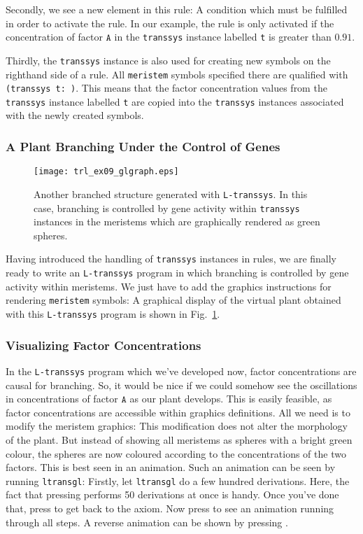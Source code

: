 \documentclass[12pt]{article}
\newcommand{\transsys}{\texttt{transsys}}
\newcommand{\ltranssys}{\texttt{L-}\transsys}
\newcommand{\codeword}[1]{\texttt{#1}}
\newcommand{\factorsym}[1]{\ensuremath{\mathtt{#1}}}
\newcommand{\prgname}[1]{\texttt{#1}}
\newcommand{\keyboardin}[1]{\fbox{\texttt{#1}}}
\begin{document}
Secondly, we see a new element in this rule: A condition which must be
fulfilled in order to activate the rule. In our example, the rule is
only activated if the concentration of factor \factorsym{A} in the
\transsys{} instance labelled \codeword{t} is greater than $0.91$.

Thirdly, the \transsys{} instance is also used for creating new
symbols on the righthand side of a rule. All \codeword{meristem}
symbols specified there are qualified with \codeword{(transsys~t:~)}.
This means that the factor concentration values from the \transsys{}
instance labelled \codeword{t} are copied into the \transsys{}
instances associated with the newly created symbols.


\subsubsection{A Plant Branching Under the Control of Genes}

\begin{figure}
\centerline{
  \texttt{[image: trl\_ex09\_glgraph.eps]}
}
\caption{\label{fig_transsysgrow}
  Another branched structure generated with \ltranssys{}. In this
  case, branching is controlled by gene activity within \transsys{}
  instances in the meristems which are graphically rendered as green
  spheres.
}
\end{figure}

Having introduced the handling of \transsys{} instances in rules, we
are finally ready to write an \ltranssys{} program in which branching
is controlled by gene activity within meristems. We just have to add
the graphics instructions for rendering \codeword{meristem} symbols:
A graphical display of the virtual plant obtained with this
\ltranssys{} program is shown in Fig.\ \ref{fig_transsysgrow}.


\subsubsection{Visualizing Factor Concentrations}

In the \ltranssys{} program which we've developed now, factor
concentrations are causal for branching. So, it would be nice if we
could somehow see the oscillations in concentrations of factor
\factorsym{A} as our plant develops. This is easily feasible, as
factor concentrations are accessible within graphics definitions. All
we need is to modify the meristem graphics:
This modification does not alter the morphology of the plant. But
instead of showing all meristems as spheres with a bright green
colour, the spheres are now coloured according to the concentrations
of the two factors. This is best seen in an animation. Such an
animation can be seen by running \prgname{ltransgl}: Firstly, let
\prgname{ltransgl} do a few hundred derivations. Here, the fact that
pressing \keyboardin{N} performs 50 derivations at once is handy. Once
you've done that, press \keyboardin{Home} to get back to the
axiom. Now press \keyboardin{>} to see an animation running through
all steps. A reverse animation can be shown by pressing \keyboardin{<}.
\end{document}
